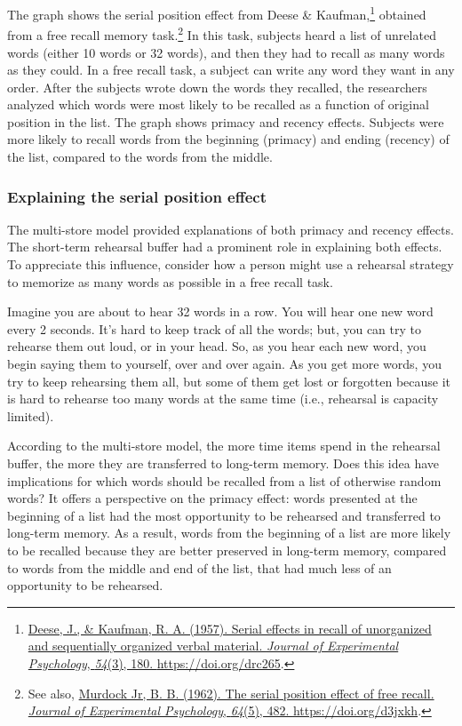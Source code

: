 \documentclass[
  oneside,
  12pt]{crumpbook}
\begin{document}
The graph shows the serial position effect from Deese \& Kaufman,\footnote{\protect\hyperlink{ref-deeseSerialEffectsRecall1957a}{Deese, J., \& Kaufman, R. A. (1957). Serial effects in recall of unorganized and sequentially organized verbal material. \emph{Journal of Experimental Psychology}, \emph{54}(3), 180. \url{https://doi.org/drc265}}.} obtained from a free recall memory task.\footnote{See also, \protect\hyperlink{ref-murdockjrSerialPositionEffect1962}{Murdock Jr, B. B. (1962). The serial position effect of free recall. \emph{Journal of Experimental Psychology}, \emph{64}(5), 482. \url{https://doi.org/d3jxkh}}.} In this task, subjects heard a list of unrelated words (either 10 words or 32 words), and then they had to recall as many words as they could. In a free recall task, a subject can write any word they want in any order. After the subjects wrote down the words they recalled, the researchers analyzed which words were most likely to be recalled as a function of original position in the list. The graph shows primacy and recency effects. Subjects were more likely to recall words from the beginning (primacy) and ending (recency) of the list, compared to the words from the middle.

\hypertarget{explaining-the-serial-position-effect}{%
\subsubsection{Explaining the serial position effect}\label{explaining-the-serial-position-effect}}

The multi-store model provided explanations of both primacy and recency effects. The short-term rehearsal buffer had a prominent role in explaining both effects. To appreciate this influence, consider how a person might use a rehearsal strategy to memorize as many words as possible in a free recall task.

Imagine you are about to hear 32 words in a row. You will hear one new word every 2 seconds. It's hard to keep track of all the words; but, you can try to rehearse them out loud, or in your head. So, as you hear each new word, you begin saying them to yourself, over and over again. As you get more words, you try to keep rehearsing them all, but some of them get lost or forgotten because it is hard to rehearse too many words at the same time (i.e., rehearsal is capacity limited).

According to the multi-store model, the more time items spend in the rehearsal buffer, the more they are transferred to long-term memory. Does this idea have implications for which words should be recalled from a list of otherwise random words? It offers a perspective on the primacy effect: words presented at the beginning of a list had the most opportunity to be rehearsed and transferred to long-term memory. As a result, words from the beginning of a list are more likely to be recalled because they are better preserved in long-term memory, compared to words from the middle and end of the list, that had much less of an opportunity to be rehearsed.
\end{document}
